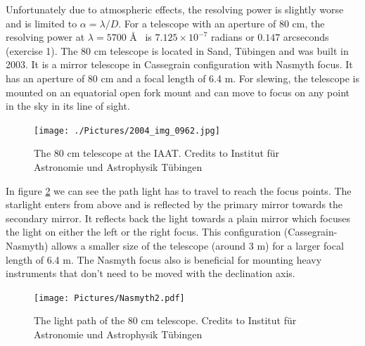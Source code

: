 \documentclass[12pt,a4paper]{article}
\begin{document}
  Unfortunately due to atmospheric effects, the resolving power is slightly worse and is limited to $\alpha = \lambda/D$. For a telescope with an aperture of 80 cm, the resolving power
  at $\lambda = 5700 $ \AA~  is $7.125\times 10^{-7}$ radians or $0.147$ arcseconds (exercise 1).
    The 80 cm telescope is located in Sand, Tübingen and was built in 2003. It is a mirror telescope in Cassegrain configuration with Nasmyth focus. It has an aperture of 80 cm and 
    a focal length of 6.4 m. For slewing, the telescope is mounted on an equatorial open fork mount and can move to focus on any point in the sky in its line of sight.
    \begin{figure}[H]
      \centering
      \texttt{[image: ./Pictures/2004\_img\_0962.jpg]}
      \caption{The 80 cm telescope at the IAAT. Credits to Institut für Astronomie und Astrophysik Tübingen\cite{IAAT_University_of_Tübingen_2025}}
      \label{fig:80cm}
    \end{figure}
    In figure \ref{fig:80cm_lp} we can see the path light has to travel to reach the focus points. The starlight enters from above and is reflected by the primary mirror towards the 
    secondary mirror. It reflects back the light towards a plain mirror which focuses the light on either the left or the right focus. This configuration (Cassegrain-Nasmyth) allows a smaller size of the telescope
    (around 3 m) for a larger focal length of 6.4 m. The Nasmyth focus also is beneficial for mounting heavy instruments that don't need to be moved with the declination axis. 
    \begin{figure}[H]
      \centering
      \texttt{[image: Pictures/Nasmyth2.pdf]}
      \caption{The light path of the 80 cm telescope. Credits to Institut für Astronomie und Astrophysik Tübingen\cite{IAAT_University_of_Tübingen_2025}}
      \label{fig:80cm_lp}
    \end{figure}
\end{document}
